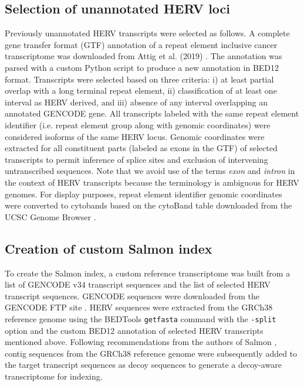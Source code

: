 \subsection*{Selection of unannotated HERV loci}
Previously unannotated HERV transcripts were selected as follows.
A complete gene transfer format (GTF) \citep{GTF} annotation of a repeat element inclusive cancer transcriptome was downloaded from Attig et al. (2019) \citep{Attig2019}.
The annotation was parsed with a custom Python script to produce a new annotation in BED12 \citep{BED12} format.
Transcripts were selected based on three criteria: i) at least partial overlap with a long terminal repeat element, ii) classification of at least one interval as HERV derived, and iii) absence of any interval overlapping an annotated GENCODE gene.
All transcripts labeled with the same repeat element identifier (i.e. repeat element group along with genomic coordinates) were considered isoforms of the same HERV locus.
Genomic coordinates were extracted for all constituent parts (labeled as exons in the GTF) of selected transcripts to permit inference of splice sites and exclusion of intervening untranscribed sequences.
Note that we avoid use of the terms \emph{exon} and \emph{intron} in the context of HERV transcripts because the terminology is ambiguous for HERV genomes.
For display purposes, repeat element identifier genomic coordinates were converted to cytobands based on the cytoBand table downloaded from the UCSC Genome Browser \citep{Furey2003, Navarro2020}.

\subsection*{Creation of custom Salmon index}
To create the Salmon index, a custom reference transcriptome was built from a list of GENCODE v34 transcript sequences \citep{Frankish2018} and the list of selected HERV transcript sequences.
GENCODE sequences were downloaded from the GENCODE FTP site \citep{GENCODE-transcripts}.
HERV sequences were extracted from the GRCh38 reference genome \citep{ENCODE-GRCh38} using the BEDTools \verb|getfasta| command \citep{Quinlan2010} with the \verb|-split| option and the custom BED12 annotation of selected HERV transcripts mentioned above.
Following recommendations from the authors of Salmon \citep{SalmonDecoys}, contig sequences from the GRCh38 reference genome were subsequently added to the target transcript sequences as decoy sequences to generate a decoy-aware transcriptome for indexing.

